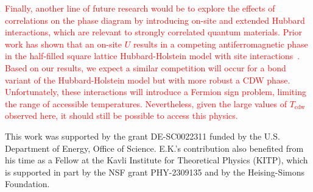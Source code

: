 \documentclass[%
reprint,
superscriptaddress,
nofootinbib,
twocolumn,
amsmath,amssymb,
aps,
prb,
]{revtex4-2}
\begin{document}
\textcolor{red}{
Finally, another line of future research would be to explore the effects of correlations on the phase diagram by introducing on-site and extended Hubbard interactions, which are relevant to strongly correlated quantum materials. Prior work has shown that an on-site $U$ results in a competing antiferromagnetic phase in the half-filled square lattice Hubbard-Holstein model with site interactions~\cite{Bauer2010quantum, Johnston2013determinant, Costa2020phase}. Based on our results, we expect a similar competition will occur for a bond variant of the Hubbard-Holstein model but with more robust a \gls*{CDW} phase. Unfortunately, these interactions will introduce a Fermion sign problem, limiting the range of accessible temperatures. Nevertheless, given the large values of $T_\mathrm{cdw}$ observed here, it should still be possible to access this physics.}

\begin{acknowledgments}
This work was supported by the grant DE-SC0022311 funded by the U.S. Department of Energy, Office of Science. E.K.'s contribution also benefited from his time as a Fellow at the Kavli Institute for Theoretical Physics (KITP), which is supported in part by the NSF grant PHY-2309135 and by the Heising-Simons Foundation.
\end{acknowledgments}


\end{document}
